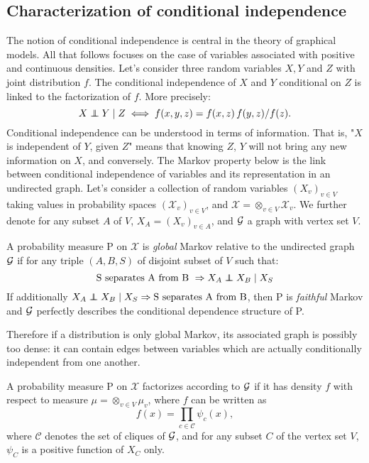 \subsection{Characterization of conditional independence}
The notion of conditional independence is central in the theory of graphical models. All that follows focuses on the case of variables associated with positive and continuous densities. Let's consider three random variables $X,Y$ and $Z$ with joint distribution $f$. The conditional independence of $X$ and $Y$ conditional on $Z$ is linked to the factorization of $f$. More precisely: 
$$X \independent Y \mid Z \iff f(x,y,z) = f(x,z) \, f(y,z)/f(z). $$
Conditional independence can be understood in terms of information. That is, "$X$ is independent of $Y$, given $Z$" means that knowing $Z$, $Y$ will not bring any new information on $X$, and conversely. The Markov property below is the link between conditional independence of variables and its representation in an undirected graph. Let's consider a collection of random variables $(X_v)_{v\in V}$ taking values in probability spaces $(\mathcal{X}_v)_{v\in V}$, and $\mathcal{X}=\otimes_{v\in V} \mathcal{X}_v$. We further denote for any subset $A$ of $V$, $X_A=(X_v)_{v\in A}$, and $\mathcal{G}$ a graph with vertex set $V$. 

\begin{definition}
A probability measure P on $\mathcal{X}$ is \textit{global} Markov relative to the undirected graph $\mathcal{G}$ if for any triple $(A, B, S)$ of disjoint subset of $V$ such that:
 $$ \text{S separates A from B } \Rightarrow X_A\independent X_B \mid X_S$$
 If additionally $X_A\independent X_B \mid X_S \Rightarrow \text{S separates A from B}  $, then P is \textit{faithful} Markov and $\mathcal{G}$ perfectly describes the conditional dependence structure of P.
\end{definition}
Therefore if a distribution is only global Markov, its associated graph is possibly too dense: it can contain edges between variables which are actually conditionally independent from one another. 
\begin{definition}[Factorization]
A probability measure P on $\mathcal{X}$ factorizes according to $\mathcal{G}$ if it has density $f$ with respect to measure $\mu = \otimes_{v\in V} \mu_v$, where $f$ can be written as
$$f(x) = \prod_{c\in \mathcal{C} }\psi_c(x),$$
where $\mathcal{C}$ denotes the set of cliques of $\mathcal{G}$, and for any subset $C$ of the vertex set $V$, $\psi_C$ is a positive function of $X_C$ only.
\end{definition}

